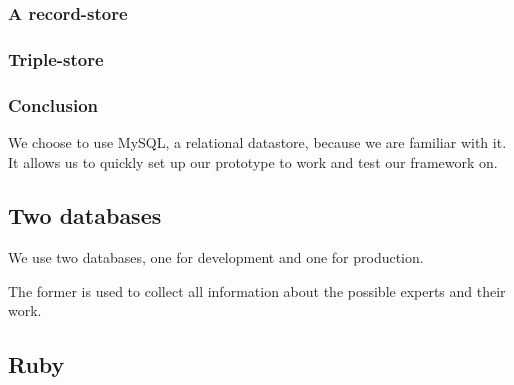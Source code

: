\subsubsection{A record-store}

\subsubsection{Triple-store}

\subsubsection{Conclusion}

We choose to use MySQL, a relational datastore, because we are familiar with it. It allows us to quickly set up our prototype to work and test our framework on.

\subsection{Two databases}

We use two databases, one for development and one for production.

The former is used to collect all information about the possible experts and their work. 

\subsection{Ruby}
